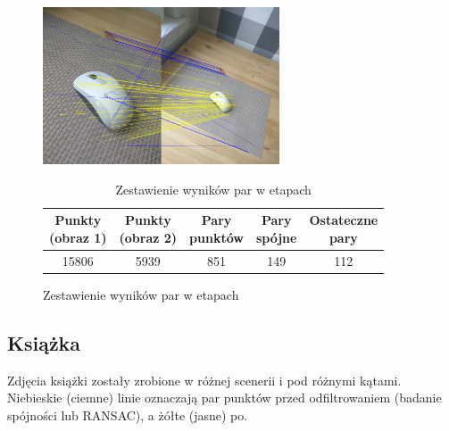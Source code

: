 \documentclass[../main.tex]{subfiles}
\begin{document}
    \begin{figure}[H]
    \centering
    \begin{minipage}{.5\textwidth}
        \caption{Wynik metody RANSAC}
        \centering
        \includegraphics[width=7cm]{mouse_kitchen_pairs_ranscons_out}
    \end{minipage}%
    \begin{minipage}{.5\textwidth}
            \begin{table}[H]
            \caption{Zestawienie wyników par w etapach}
            \label{t:mouse}
            \begin{center}
            \begin{tabular}{|c|c|c|c|c|} 
            \hline
            \thead{Punkty \\ (obraz 1)} & \thead{Punkty \\ (obraz 2)} & \thead{Pary \\ punktów} & \thead{Pary \\ spójne} &
            \thead{Ostateczne \\ pary} \\
            \hline
            {15806} & {5939} & {851} & {149} & {112} \\
            \hline
            \end{tabular}
            \end{center}
            \end{table}
    \end{minipage}%
    \end{figure}

    
    \subsection{Książka}
    Zdjęcia książki zostały zrobione w różnej scenerii i pod różnymi kątami. Niebieskie (ciemne)  linie oznaczają par punktów przed odfiltrowaniem (badanie spójności lub RANSAC), a żółte (jasne) po.
    
\end{document}
